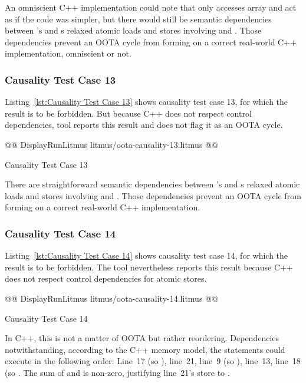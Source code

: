 \documentclass[10]{article}
\begin{document}
An omniscient C++ implementation could note that only  accesses
array  and act as if the code was simpler, but there would
still be semantic dependencies between 's and s
relaxed atomic loads and stores involving  and .
Those dependencies prevent an OOTA cycle from forming on a correct
real-world C++ implementation, omniscient or not.

\subsubsection{Causality Test Case 13}
\label{app:Causality Test Case 13}

Listing~\ref{lst:Causality Test Case 13}
shows causality test case 13, for which the 
result is to be forbidden.
But because C++ does not respect control dependencies,  tool
reports this result and does not flag it as an OOTA cycle.

\begin{listing}[tbp]
@@ DisplayRunLitmus litmus/oota-causality-13.litmus @@
\caption{Causality Test Case 13}
\label{lst:Causality Test Case 13}
\end{listing}

There are straightforward semantic dependencies between 's and
s relaxed atomic loads and stores involving  and .
Those dependencies prevent an OOTA cycle from forming on a correct
real-world C++ implementation.

\subsubsection{Causality Test Case 14}
\label{app:Causality Test Case 14}

Listing~\ref{lst:Causality Test Case 14}
shows causality test case 14, for which the 
result is to be forbidden.
The  tool nevertheless reports this result because C++ does not
respect control dependencies for atomic stores.

\begin{listing}[tbp]
@@ DisplayRunLitmus litmus/oota-causality-14.litmus @@
\caption{Causality Test Case 14}
\label{lst:Causality Test Case 14}
\end{listing}

In C++, this is not a matter of OOTA but rather reordering.
Dependencies notwithstanding, according to the C++ memory model,
the statements could execute in the following order:
Line~17 (so ), line~21, line~9 (so ),
line~13, line~18 (so .
The sum of  and  is non-zero, justifying line~21's
store to .
\end{document}
